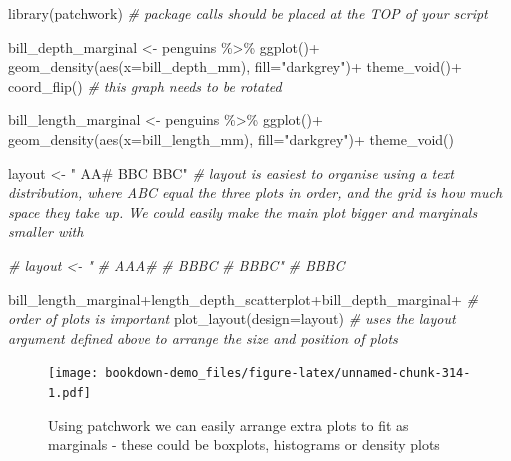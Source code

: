 \documentclass[
]{book}
\newenvironment{Shaded}{\begin{snugshade}}{\end{snugshade}}
\newcommand{\AttributeTok}[1]{\textcolor[rgb]{0.77,0.63,0.00}{#1}}
\newcommand{\CommentTok}[1]{\textcolor[rgb]{0.56,0.35,0.01}{\textit{#1}}}
\newcommand{\FunctionTok}[1]{\textcolor[rgb]{0.00,0.00,0.00}{#1}}
\newcommand{\NormalTok}[1]{#1}
\newcommand{\OtherTok}[1]{\textcolor[rgb]{0.56,0.35,0.01}{#1}}
\newcommand{\SpecialCharTok}[1]{\textcolor[rgb]{0.00,0.00,0.00}{#1}}
\newcommand{\StringTok}[1]{\textcolor[rgb]{0.31,0.60,0.02}{#1}}
\begin{document}
\begin{Shaded}
\begin{Highlighting}[]
\FunctionTok{library}\NormalTok{(patchwork) }\CommentTok{\# package calls should be placed at the TOP of your script}

\NormalTok{bill\_depth\_marginal }\OtherTok{\textless{}{-}}\NormalTok{ penguins }\SpecialCharTok{\%\textgreater{}\%} 
  \FunctionTok{ggplot}\NormalTok{()}\SpecialCharTok{+}
  \FunctionTok{geom\_density}\NormalTok{(}\FunctionTok{aes}\NormalTok{(}\AttributeTok{x=}\NormalTok{bill\_depth\_mm), }\AttributeTok{fill=}\StringTok{"darkgrey"}\NormalTok{)}\SpecialCharTok{+}
  \FunctionTok{theme\_void}\NormalTok{()}\SpecialCharTok{+}
  \FunctionTok{coord\_flip}\NormalTok{() }\CommentTok{\# this graph needs to be rotated}

\NormalTok{bill\_length\_marginal }\OtherTok{\textless{}{-}}\NormalTok{ penguins }\SpecialCharTok{\%\textgreater{}\%} 
  \FunctionTok{ggplot}\NormalTok{()}\SpecialCharTok{+}
  \FunctionTok{geom\_density}\NormalTok{(}\FunctionTok{aes}\NormalTok{(}\AttributeTok{x=}\NormalTok{bill\_length\_mm), }\AttributeTok{fill=}\StringTok{"darkgrey"}\NormalTok{)}\SpecialCharTok{+}
  \FunctionTok{theme\_void}\NormalTok{()}

\NormalTok{layout }\OtherTok{\textless{}{-}} \StringTok{"}
\StringTok{AA\#}
\StringTok{BBC}
\StringTok{BBC"}
\CommentTok{\# layout is easiest to organise using a text distribution, where ABC equal the three plots in order, and the grid is how much space they take up. We could easily make the main plot bigger and marginals smaller with}

\CommentTok{\# layout \textless{}{-} "}
\CommentTok{\# AAA\#}
\CommentTok{\# BBBC}
\CommentTok{\# BBBC"}
\CommentTok{\# BBBC}

\NormalTok{bill\_length\_marginal}\SpecialCharTok{+}\NormalTok{length\_depth\_scatterplot}\SpecialCharTok{+}\NormalTok{bill\_depth\_marginal}\SpecialCharTok{+} \CommentTok{\# order of plots is important}
  \FunctionTok{plot\_layout}\NormalTok{(}\AttributeTok{design=}\NormalTok{layout) }\CommentTok{\# uses the layout argument defined above to arrange the size and position of plots}
\end{Highlighting}
\end{Shaded}

\begin{figure}
\centering
\texttt{[image: bookdown-demo\_files/figure-latex/unnamed-chunk-314-1.pdf]}
\caption{\label{fig:unnamed-chunk-314}Using patchwork we can easily arrange extra plots to fit as marginals - these could be boxplots, histograms or density plots}
\end{figure}
\end{document}
